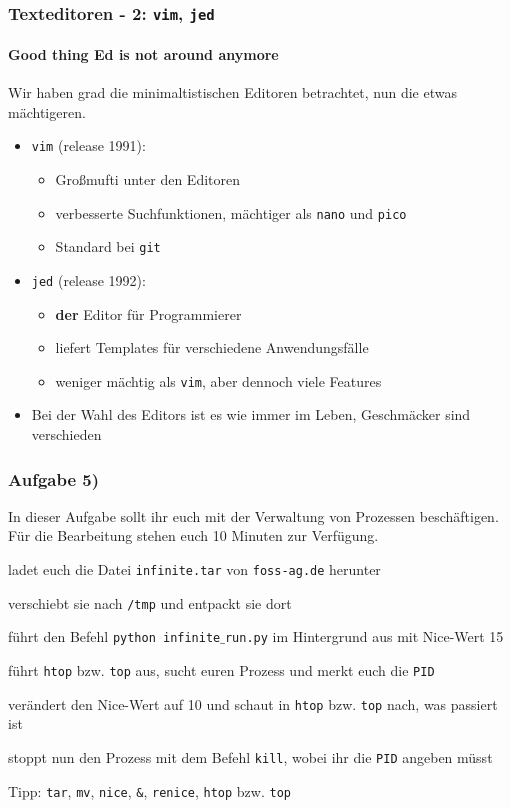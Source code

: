 \documentclass[12pt,utf8, handout]{beamer}
\begin{document}
\begin{frame}
\frametitle{Texteditoren - 2: \texttt{vim}, \texttt{jed}}
\framesubtitle{\textcolor{ownDarkOr}{Good thing Ed is not around anymore}}
Wir haben grad die minimaltistischen Editoren betrachtet, nun die etwas mächtigeren.
\begin{itemize}
	\item \texttt{vim} (release 1991):
	\begin{itemize}[<+->]
		\item Großmufti unter den Editoren
		\item verbesserte Suchfunktionen, mächtiger als \texttt{nano} und \texttt{pico}
		\item Standard bei \texttt{git}
	\end{itemize}
	\item \texttt{jed} (release 1992):
	\begin{itemize}[<+->]
		\item \textbf{der} Editor für Programmierer
		\item liefert Templates für verschiedene Anwendungsfälle
		\item weniger mächtig als \texttt{vim}, aber dennoch viele Features
	\end{itemize}
	\item Bei der Wahl des Editors ist es wie immer im Leben, Geschmäcker sind verschieden
\end{itemize}
\end{frame}

\begin{frame}
\frametitle{Aufgabe 5)}
In dieser Aufgabe sollt ihr euch mit der Verwaltung von Prozessen beschäftigen.
Für die Bearbeitung stehen euch 10 Minuten zur Verfügung.
\begin{itemize}
	{\footnotesize
	\item ladet euch die Datei \texttt{infinite.tar} von \texttt{foss-ag.de} herunter
	\item verschiebt sie nach \texttt{/tmp} und entpackt sie dort
	\item führt den Befehl \texttt{python infinite$\_$run.py} im Hintergrund aus mit Nice-Wert 15
	\item führt \texttt{htop} bzw. \texttt{top} aus, sucht euren Prozess und merkt euch die \texttt{PID}
	\item verändert den Nice-Wert auf 10 und schaut in \texttt{htop} bzw. \texttt{top} nach, was passiert ist
	\item stoppt nun den Prozess mit dem Befehl \texttt{kill}, wobei ihr die \texttt{PID} angeben müsst
	}
\end{itemize}
{\scriptsize Tipp: \texttt{tar}, \texttt{mv}, \texttt{nice}, \texttt{\&}, \texttt{renice}, \texttt{htop} bzw. \texttt{top}}
\end{frame}
\end{document}
